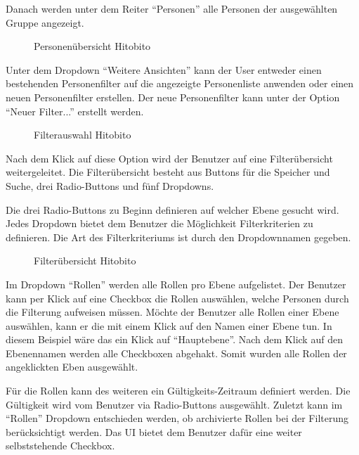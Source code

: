 \newpage

Danach werden unter dem Reiter ``Personen'' alle Personen der ausgewählten Gruppe angezeigt.
\begin{figure}[h]
   \centering
   \caption{Personenübersicht Hitobito}
\end{figure}

Unter dem Dropdown ``Weitere Ansichten'' kann der User entweder einen bestehenden Personenfilter auf die angezeigte Personenliste anwenden 
oder einen neuen Personenfilter erstellen. Der neue Personenfilter kann unter der Option ``Neuer Filter...'' erstellt werden.

\begin{figure}[h]
   \centering
   \caption{Filterauswahl Hitobito}
\end{figure}

\newpage

Nach dem Klick auf diese Option wird der Benutzer auf eine Filterübersicht weitergeleitet. Die Filterübersicht besteht aus Buttons für die Speicher und Suche, drei Radio-Buttons und fünf Dropdowns.

Die drei Radio-Buttons zu Beginn definieren auf welcher Ebene gesucht wird.
Jedes Dropdown bietet dem Benutzer die Möglichkeit Filterkriterien zu definieren. Die Art des Filterkriteriums ist durch
den Dropdownnamen gegeben.


\begin{figure}[h]
   \centering
   \caption{Filterübersicht Hitobito}
\end{figure}

\newpage

Im Dropdown ``Rollen'' werden alle Rollen pro Ebene aufgelistet. Der Benutzer kann per Klick auf eine Checkbox
die Rollen auswählen, welche Personen durch die Filterung aufweisen müssen. Möchte der Benutzer alle Rollen einer Ebene auswählen,
kann er die mit einem Klick auf den Namen einer Ebene tun. In diesem Beispiel wäre das ein Klick auf ``Hauptebene''. Nach dem Klick auf den
Ebenennamen werden alle Checkboxen abgehakt. Somit wurden alle Rollen der angeklickten Eben ausgewählt.

Für die Rollen kann des weiteren ein Gültigkeits-Zeitraum definiert werden. Die Gültigkeit
wird vom Benutzer via Radio-Buttons ausgewählt. Zuletzt kann im ``Rollen'' Dropdown entschieden werden, ob 
archivierte Rollen bei der Filterung berücksichtigt werden. Das UI bietet dem Benutzer dafür eine weiter selbststehende
Checkbox.

